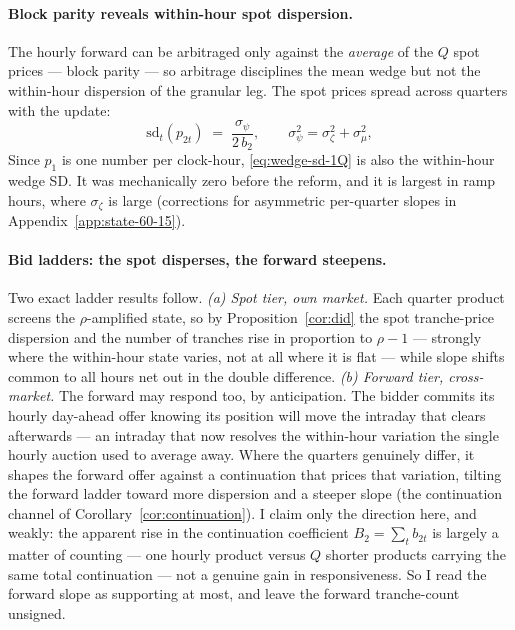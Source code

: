\documentclass[11pt,a4paper]{article}
\theoremstyle{definition}
\theoremstyle{remark}
\theoremstyle{plain}
\begin{document}
\paragraph{Block parity reveals within-hour spot dispersion.} The hourly forward can be arbitraged only against the \emph{average} of the $Q$ spot prices --- block parity --- so arbitrage disciplines the mean wedge but not the within-hour dispersion of the granular leg. The spot prices spread across quarters with the update:
\begin{equation}
\boxed{\;\mathrm{sd}_t(p_{2t}) \;=\; \frac{\sigma_\psi}{2\, b_2}, \qquad \sigma_\psi^2 = \sigma_\zeta^2 + \sigma_\mu^2,\;}
\label{eq:wedge-sd-1Q}
\end{equation}
Since $p_1$ is one number per clock-hour, \eqref{eq:wedge-sd-1Q} is also the within-hour wedge SD. It was mechanically zero before the reform, and it is largest in ramp hours, where $\sigma_\zeta$ is large (corrections for asymmetric per-quarter slopes in Appendix~\ref{app:state-60-15}).

\paragraph{Bid ladders: the spot disperses, the forward steepens.} Two exact ladder results follow. \emph{(a) Spot tier, own market.} Each quarter product screens the $\rho$-amplified state, so by Proposition~\ref{cor:did} the spot tranche-price dispersion and the number of tranches rise in proportion to $\rho - 1$ --- strongly where the within-hour state varies, not at all where it is flat --- while slope shifts common to all hours net out in the double difference. \emph{(b) Forward tier, cross-market.} The forward may respond too, by anticipation. The bidder commits its hourly day-ahead offer knowing its position will move the intraday that clears afterwards --- an intraday that now resolves the within-hour variation the single hourly auction used to average away. Where the quarters genuinely differ, it shapes the forward offer against a continuation that prices that variation, tilting the forward ladder toward more dispersion and a steeper slope (the continuation channel of Corollary~\ref{cor:continuation}). I claim only the direction here, and weakly: the apparent rise in the continuation coefficient $B_2 = \sum_t b_{2t}$ is largely a matter of counting --- one hourly product versus $Q$ shorter products carrying the same total continuation --- not a genuine gain in responsiveness. So I read the forward slope as supporting at most, and leave the forward tranche-count unsigned.
\end{document}
